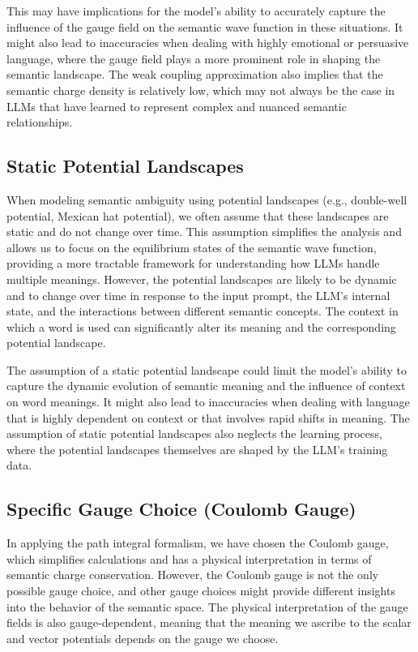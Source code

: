 \documentclass[prd,amsmath,amssymb,12pt]{revtex4}
\begin{document}
This may have implications for the model's ability to accurately capture
the influence of the gauge field on the semantic wave function in these situations.
It might also lead to inaccuracies when dealing with highly emotional or
persuasive language, where the gauge field plays a more prominent role in
shaping the semantic landscape. The weak coupling approximation also implies
that the semantic charge density is relatively low, which may not always be
the case in LLMs that have learned to represent complex and nuanced semantic
relationships.


\subsection{Static Potential Landscapes}

When modeling semantic ambiguity using potential landscapes (e.g.,
double-well potential, Mexican hat potential), we often assume that these
landscapes are static and do not change over time. This assumption simplifies
the analysis and allows us to focus on the equilibrium states of the semantic
wave function, providing a more tractable framework for understanding how
LLMs handle multiple meanings. However, the potential landscapes are likely
to be dynamic and to change over time in response to the input prompt, the
LLM's internal state, and the interactions between different semantic concepts.
The context in which a word is used can significantly alter its meaning and
the corresponding potential landscape.

The assumption of a static potential landscape could limit the model's ability
to capture the dynamic evolution of semantic meaning and the influence of
context on word meanings.
It might also lead to inaccuracies when dealing with language that is highly
dependent on context or that involves rapid shifts in meaning. The assumption
of static potential landscapes also neglects the learning process, where the
potential landscapes themselves are shaped by the LLM's training data.


\subsection{Specific Gauge Choice (Coulomb Gauge)}

In applying the path integral formalism, we have chosen the Coulomb gauge,
which simplifies calculations and has a physical interpretation in terms of
semantic charge conservation. However, the Coulomb gauge is not the only
possible gauge choice, and other gauge choices might provide different
insights into the behavior of the semantic space. The physical interpretation
of the gauge fields is also gauge-dependent, meaning that the meaning we
ascribe to the scalar and vector potentials depends on the gauge we choose.
\end{document}
